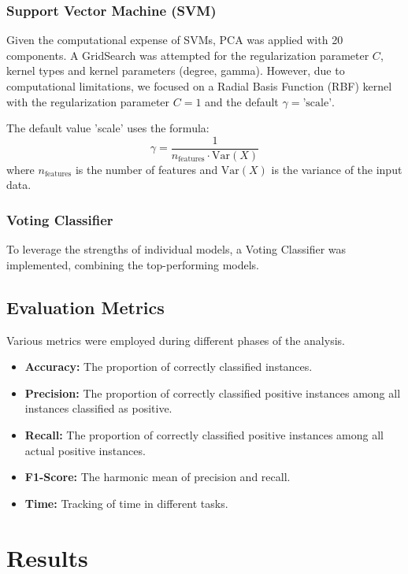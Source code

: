 \documentclass[twocolumn]{article}
\begin{document}
\subsubsection{Support Vector Machine (SVM)}
Given the computational expense of SVMs, PCA was applied with 20 components. A GridSearch was attempted for the regularization parameter \( C \), kernel types and kernel parameters (degree, gamma).
However, due to computational limitations, we focused on a Radial Basis Function (RBF) kernel with the regularization parameter \(C =1 \) and the default \( \gamma = \text{'scale'} \).

The default value 'scale' uses the formula: 
\[ \gamma = \frac{1}{n_{\text{features}} \cdot \text{Var}(X)} \] where \( n_{\text{features}} \) is the number of features and \( \text{Var}(X) \) is the variance of the input data.

\subsubsection{Voting Classifier}
To leverage the strengths of individual models, a Voting Classifier was implemented, combining the top-performing models.

\subsection{Evaluation Metrics}
Various metrics were employed during different phases of the analysis.

\begin{itemize}
    \item \textbf{Accuracy:} The proportion of correctly classified instances.
    \item \textbf{Precision:} The proportion of correctly classified positive instances among all instances classified as positive.
    \item \textbf{Recall:} The proportion of correctly classified positive instances among all actual positive instances.
    \item \textbf{F1-Score:} The harmonic mean of precision and recall.
    \item \textbf{Time:} Tracking of time in different tasks.
\end{itemize}

\section{Results}
\end{document}

